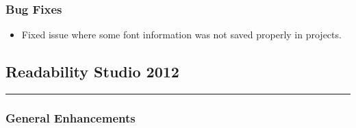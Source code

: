 \documentclass[
]{book}
\providecommand{\tightlist}{%
  \setlength{\itemsep}{0pt}\setlength{\parskip}{0pt}}
\theoremstyle{definition}
\theoremstyle{definition}
\theoremstyle{definition}
\theoremstyle{definition}
\theoremstyle{remark}
\begin{document}
\hypertarget{bug-fixes-2}{%
\subsubsection*{Bug Fixes}\label{bug-fixes-2}}

\begin{itemize}
\tightlist
\item
  Fixed issue where some font information was not saved properly in projects.
\end{itemize}

\hypertarget{readability-studio-2012}{%
\subsection*{Readability Studio 2012}\label{readability-studio-2012}}

\begin{center}\rule{0.5\linewidth}{0.5pt}\end{center}

\hypertarget{general-enhancements-3}{%
\subsubsection*{General Enhancements}\label{general-enhancements-3}}
\end{document}
